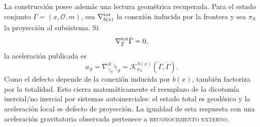 La construcción posee además una lectura geométrica recuperada. Para el
estado conjunto \(\Gamma=(x,\mathcal O,m)\), sea
\(\nabla^{\rm tot}_{b(x)}\) la conexión inducida por la frontera y sea
\(\pi_S\) la proyección al subsistema. Si
\[
 \nabla^{\rm tot}_{\dot\Gamma}\dot\Gamma=0,
\]
la aceleración publicada es
\[
 a_S
 =\nabla^S_{\dot\gamma_S}\dot\gamma_S
 =\mathcal K_{\pi_S}^{\,b(x)}(\dot\Gamma,\dot\Gamma).
\]
Como el defecto depende de la conexión inducida por \(b(x)\), también
factoriza por la totalidad. Esto cierra matemáticamente el reemplazo de la
dicotomía inercial/no inercial por sistemas autoinerciales: el estado total
es geodésico y la aceleración local es defecto de proyección. La igualdad de
esta respuesta con una aceleración gravitatoria observada pertenece a
\textsc{reconocimiento externo}.

